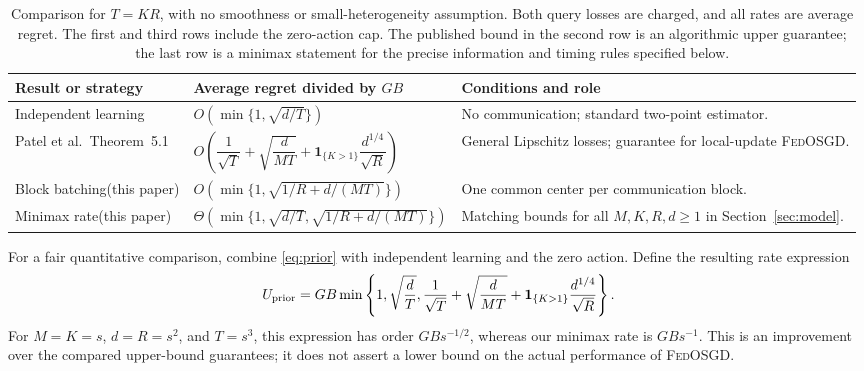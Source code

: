 \documentclass[11pt,a4paper]{article}
\numberwithin{equation}{section}
\theoremstyle{remark}
\newcommand{\ind}{\mathbf 1}
\begin{document}
\begin{table}[t]
\centering
\small
\renewcommand{\arraystretch}{1.35}
\setlength{\tabcolsep}{4pt}
\begin{tabularx}{\textwidth}{@{}>{\raggedright\arraybackslash}p{}p{}Y@{}}
\toprule
Result or strategy & Average regret divided by $GB$ & Conditions and role\\
\midrule
Independent learning
& $O\!\left(\min\{1,\sqrt{d/T}\}\right)$
& No communication; standard two-point estimator.\\
Patel et al.~\cite{PWSS23}\newline Theorem~5.1
& $O\!\left(\dfrac1{\sqrt T}+\sqrt{\dfrac d{MT}}
       +\ind_{\{K>1\}}\dfrac{d^{1/4}}{\sqrt R}\right)$
& General Lipschitz losses; guarantee for local-update \textsc{FedOSGD}.\\
Block batching\newline (this paper)
& $O\!\left(\min\{1,\sqrt{1/R+d/(MT)}\}\right)$
& One common center per communication block.\\
Minimax rate\newline (this paper)
& $\Theta\!\left(\min\{1,\sqrt{d/T},
                 \sqrt{1/R+d/(MT)}\}\right)$
& Matching bounds for all $M,K,R,d\ge1$ in Section~\ref{sec:model}.\\
\bottomrule
\end{tabularx}
\caption{Comparison for $T=KR$, with no smoothness or small-heterogeneity
assumption. Both query losses are charged, and all rates are average
regret. The first and third rows include the zero-action cap. The
published bound in the second row is an algorithmic upper guarantee;
the last row is a minimax statement for the precise information and
timing rules specified below.}
\label{tab:comparison}
\end{table}

For a fair quantitative comparison, combine \eqref{eq:prior} with
independent learning and the zero action. Define the resulting rate
expression
\begin{equation}
 U_{\rm prior}=GB\min\left\{1,\sqrt{\frac dT},
 \frac1{\sqrt T}+\sqrt{\frac d{MT}}
       +\ind_{\{K>1\}}\frac{d^{1/4}}{\sqrt R}\right\}.
 \label{eq:prior-envelope}
\end{equation}
For $M=K=s$, $d=R=s^2$, and $T=s^3$, this expression has order
$GBs^{-1/2}$, whereas our minimax rate is $GBs^{-1}$. This is an
improvement over the compared upper-bound guarantees; it does not assert
a lower bound on the actual performance of \textsc{FedOSGD}.
\end{document}
